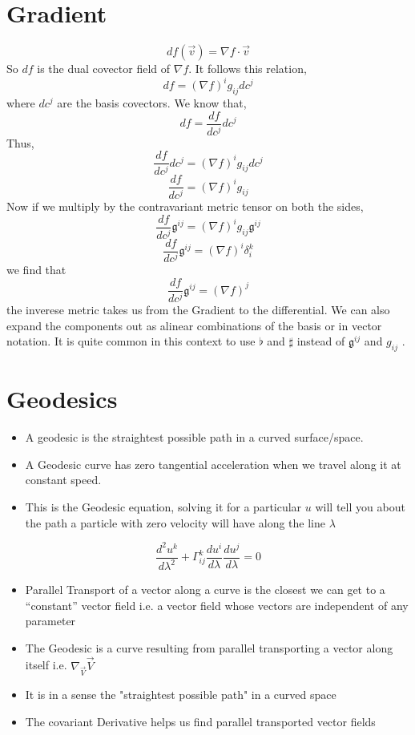 \section{Gradient}
\begin{equation}
df(\vec{v}) = \nabla f \cdot \vec{v} 
\end{equation}
So $df$ is the dual covector field of $\nabla f$. It follows this relation,
\begin{equation}
df = (\nabla f)^{i} g_{ij}dc^{j} 
\end{equation}
where $dc^{j}$ are the basis covectors. We know that,
$$df = \frac{df}{dc^{j}}dc^{j}$$
Thus,
$$\frac{df}{dc^{j}}dc^{j} = (\nabla f)^{i} g_{ij}dc^{j}$$
\begin{equation}
	\frac{df}{dc^{j}} = (\nabla f)^{i} g_{ij}
\end{equation}
Now if we multiply by the contravariant metric tensor on both the sides,
$$\frac{df}{dc^{j}}\mathfrak{g}^{ij} = (\nabla f)^{i} g_{ij}\mathfrak{g}^{ij}$$
$$\frac{df}{dc^{j}}\mathfrak{g}^{ij} = (\nabla f)^{i} \delta^{k}_{i}$$
we find that
\begin{equation}
	\frac{df}{dc^{j}} \mathfrak{g}^{ij} = (\nabla f)^{j}
\end{equation}
the inverese metric takes us from the Gradient to the differential. We can also expand the components out as alinear combinations of the basis or in vector notation. It is quite common in this context to use $\flat$ and $\sharp$ instead of $\mathfrak{g}^{ij}$ and $g_{ij}$ .
\section{Geodesics}
\begin{itemize}
\item A geodesic is the straightest possible path in a curved surface/space. 
\item A Geodesic curve has zero tangential acceleration when we travel along it at constant speed.
\item This is the Geodesic equation, solving it for a particular $u$ will tell you about the path a particle with zero velocity will have along the line $\lambda$
\end{itemize}
\begin{equation}
\frac{d^{2} u^{k}}{d \lambda^{2}} + \Gamma^{k}_{ij}\frac{d u^{i}}{d \lambda}\frac{d u^{j}}{d \lambda} = 0
\end{equation}
\begin{itemize}
\item  Parallel Transport of a vector along a curve is the closest we can get to a “constant” vector field i.e. a vector field whose vectors are independent of any parameter
\item The Geodesic is a curve resulting from parallel transporting  a vector along itself i.e. $\nabla_{\vec{V}}\vec{V}$
\item It is in a sense the "straightest possible path" in a curved space
\item The covariant Derivative helps us find parallel transported vector fields
\end{itemize}
